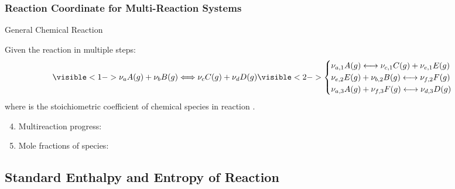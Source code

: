 \documentclass[10pt,compress,unknownkeysallowed]{beamer}
\begin{document}
\begin{frame}
  \frametitle{Reaction Coordinate for Multi-Reaction Systems}
  \begin{block}{\begin{center}General Chemical Reaction\end{center}}
        Given the reaction in multiple steps:
        \begin{displaymath}
           \visible<1->{\nu_{a}A(g) + \nu_{b}B(g) \Longleftrightarrow \nu_{c}C(g) + \nu_{d}D(g)}\visible<2->{ \begin{cases}
               \nu_{a,1}A(g) \longleftrightarrow \nu_{c,1}C(g) + \nu_{e,1}E(g) & \\
               \nu_{e,2}E(g) + \nu_{b,2}B(g) \longleftrightarrow \nu_{f,2}F(g) & \\
               \nu_{a,3}A(g) + \nu_{f,3}F(g) \longleftrightarrow \nu_{d,3}D(g) & 
           \end{cases}}
         \end{displaymath} 
         where  is the stoichiometric coefficient of chemical species  in reaction .
  \end{block}
        \begin{enumerate} \setcounter{enumi}{3}
           \item<3-> Multireaction progress:
           \item<4-> Mole fractions of species:     
        \end{enumerate}
\end{frame}
\normalsize


\subsection{Standard Enthalpy and Entropy of Reaction}
\end{document}
